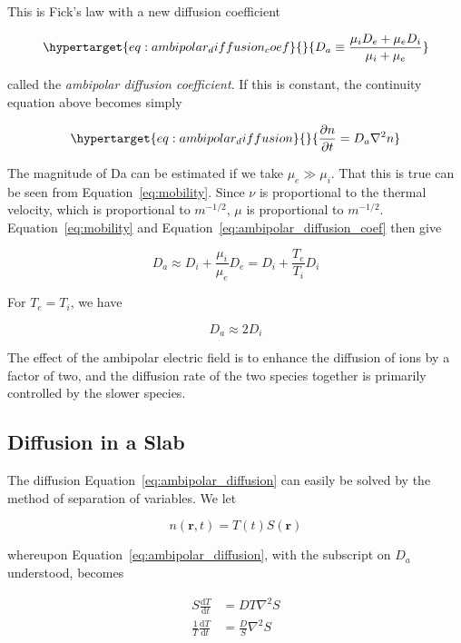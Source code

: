 \documentclass[
  notoc %
]{tufte-book}
\begin{document}
This is Fick's law with a new diffusion coefficient

\begin{equation}\protect\hypertarget{eq:ambipolar_diffusion_coef}{}{
D_a \equiv \frac{\mu_iD_e + \mu_eD_i}{\mu_i+\mu_e}
}\label{eq:ambipolar_diffusion_coef}\end{equation}

called the \emph{ambipolar diffusion coefficient}. If this is constant,
the continuity equation above becomes simply

\begin{equation}\protect\hypertarget{eq:ambipolar_diffusion}{}{
\frac{\partial n}{\partial t} = D_a \nabla^2 n
}\label{eq:ambipolar_diffusion}\end{equation}

The magnitude of Da can be estimated if we take \(\mu_e\gg\mu_i\). That
this is true can be seen from Equation~\ref{eq:mobility}. Since \(\nu\)
is proportional to the thermal velocity, which is proportional to
\(m^{-1/2}\), \(\mu\) is proportional to \(m^{-1/2}\).
Equation~\ref{eq:mobility} and
Equation~\ref{eq:ambipolar_diffusion_coef} then give

\[
D_a \approx D_i + \frac{\mu_i}{\mu_e}D_e = D_i + \frac{T_e}{T_i}D_i
\]

For \(T_e = T_i\), we have

\[
D_a \approx 2D_i
\]

The effect of the ambipolar electric field is to enhance the diffusion
of ions by a factor of two, and the diffusion rate of the two species
together is primarily controlled by the slower species.

\hypertarget{diffusion-in-a-slab}{%
\subsection{Diffusion in a Slab}\label{diffusion-in-a-slab}}

The diffusion Equation~\ref{eq:ambipolar_diffusion} can easily be solved
by the method of separation of variables. We let

\[
n(\mathbf{r}, t) = T(t)S(\mathbf{r})
\]

whereupon Equation~\ref{eq:ambipolar_diffusion}, with the subscript on
\(D_a\) understood, becomes

\[
\begin{aligned}
S\frac{\mathrm{d}T}{\mathrm{d}t} &= DT\nabla^2 S \\
\frac{1}{T}\frac{\mathrm{d}T}{\mathrm{d}t} &= \frac{D}{S}\nabla^2 S
\end{aligned}
\]
\end{document}

